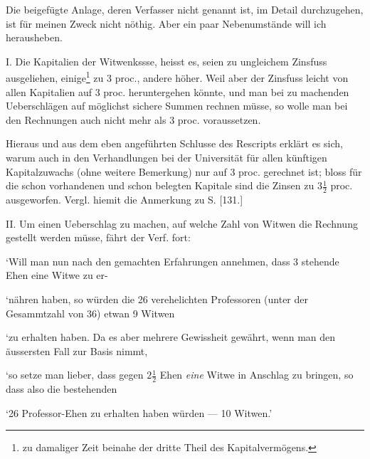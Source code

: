 Die beigefügte Anlage, deren Verfasser nicht genannt ist, im Detail durchzugehen, ist für meinen Zweck nicht nöthig. Aber ein paar Nebenumstände will ich herausheben.

I. Die Kapitalien der Witwenkssse, heisst es, seien zu ungleichem Zinsfuss ausgeliehen, einige\footnote{zu damaliger Zeit beinahe der dritte Theil des Kapitalvermögens.} zu 3 proc., andere höher. Weil aber der Zinsfuss leicht von allen Kapitalien auf 3 proc. heruntergehen könnte, und man bei zu machenden Ueberschlägen auf möglichst sichere Summen rechnen müsse, so wolle man bei den Rechnungen auch nicht mehr als 3 proc. voraussetzen.

Hieraus und aus dem eben angeführten Schlusse des Rescripts erklärt es sich, warum auch in den Verhandlungen bei der Universität für allen künftigen Kapitalzuwachs (ohne weitere Bemerkung) nur auf 3 proc. gerechnet ist; bloss für die schon vorhandenen und schon belegten Kapitale sind die Zinsen zu \(3\tfrac12\) proc. ausgeworfen. Vergl. hiemit die Anmerkung zu S. [131.]

II. Um einen Ueberschlag zu machen, auf welche Zahl von Witwen die Rechnung gestellt werden müsse, fährt der Verf. fort:

‘Will man nun nach den gemachten Erfahrungen annehmen, dass 3 stehende Ehen eine Witwe zu er-\par
\noindent ‘nähren haben, so würden die 26 verehelichten Professoren (unter der Gesammtzahl von 36) etwan 9 Witwen\par
\noindent ‘zu erhalten haben. Da es aber mehrere Gewissheit gewährt, wenn man den äussersten Fall zur Basis nimmt,\par
\noindent ‘so setze man lieber, dass gegen \(2\tfrac12\) Ehen \textit{eine} Witwe in Anschlag zu bringen, so dass also die bestehenden\par
\noindent ‘26 Professor-Ehen zu erhalten haben würden — 10 Witwen.’
